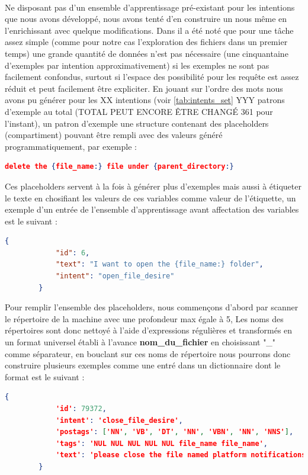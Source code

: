 		\paragraph{}
		Ne disposant pas d'un ensemble d'apprentissage pré-existant pour les intentions que nous avons développé, nous avons tenté d'en construire un nous même en l'enrichissant avec quelque modifications. Dans \cite{rasa_nlu} il a été noté que pour une tâche assez simple (comme pour notre cas l'exploration des fichiers dans un premier temps) une grande quantité de données n'est pas nécessaire (une cinquantaine d'exemples par intention approximativement) si les exemples ne sont pas facilement confondus, surtout si l'espace des possibilité pour les requête est assez réduit et peut facilement être expliciter. En jouant sur l'ordre des mots nous avons pu générer pour les XX intentions (voir \ref{tab:intents_set} YYY patrons d'exemple au total (TOTAL PEUT ENCORE ÊTRE CHANGÉ 361 pour l'instant), un patron d'exemple une structure contenant des placeholders (compartiment) pouvant être rempli avec des valeurs généré programmatiquement, par exemple : 
		\begin{lstlisting}[language=json]
		delete the {file_name:} file under {parent_directory:}\end{lstlisting}
		Ces placeholders servent à la fois à générer plus d'exemples mais aussi à étiqueter le texte en chosifiant les valeurs de ces variables comme valeur de l'étiquette, un exemple d'un entrée de l'ensemble d'apprentissage avant affectation des variables est le suivant : 
		\begin{lstlisting}[language=json]
		{
			"id": 6,
			"text": "I want to open the {file_name:} folder",
			"intent": "open_file_desire"
		}
		\end{lstlisting}
		Pour remplir l'ensemble des placeholders, nous commençons d'abord par scanner le répertoire de la machine avec une profondeur max égale à 5,
		Les noms des répertoires sont donc nettoyé à l'aide d'expressions régulières et transformés en un format universel établi à l'avance \textbf{nom\_du\_fichier} en choisissant "\_" comme séparateur, en bouclant sur ces noms de répertoire nous pourrons donc construire plusieurs exemples comme une entré dans un dictionnaire dont le format est le suivant : 
		\begin{lstlisting}[language=json]
		{
			'id': 79372,
			'intent': 'close_file_desire',
			'postags': ['NN', 'VB', 'DT', 'NN', 'VBN', 'NN', 'NNS'],
			'tags': 'NUL NUL NUL NUL NUL file_name file_name',
			'text': 'please close the file named platform notifications'
		}
		\end{lstlisting}
